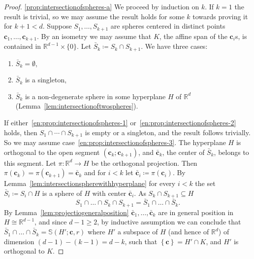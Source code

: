 \documentclass[12pt]{amsart}
\newcommand{\R}{\mathbb{R}}	%
\newcommand{\set}[1]{\mathopen \{ {#1} \mathclose \}} %
\newcommand{\setLR}[1]{\left \{ {#1} \right \}} %
\theoremstyle{plain}
\theoremstyle{definition}
\theoremstyle{remark}
\begin{document}
\begin{proof}
\ref{prop:intersectionofspheres-a} 
We proceed by induction on \( k \).
If \( k = 1 \) the result is trivial, so we may assume the result holds for some \( k \) towards proving it for \( k + 1 < d \).
Suppose \( S_1 , \dots , S_{ k + 1 } \) are spheres centered in distinct points \( \mathbf{c}_1 , \dots , \mathbf{c}_{ k + 1} \).
By an isometry we may assume that \( K \), the affine span of the \( \mathbf{c}_i \)s, is contained in \( \R^ { d - 1 } \times \set{0} \).
Let \( \bar{S}_k \coloneqq S_k \cap S_{k + 1} \).
We have three cases:
\begin{enumerate}[label={\upshape (\arabic*)}]
\item\label{en:prop:intersectionofspheres-1}
\( \bar{S}_k = \emptyset \),
\item\label{en:prop:intersectionofspheres-2}
\( \bar{S}_k \) is a singleton,
\item\label{en:prop:intersectionofspheres-3}
\( \bar{S}_k \) is a non-degenerate sphere in some hyperplane \( H \) of \( \R^d \) (Lemma~\ref{lem:intersectionoftwospheres}).
\end{enumerate} 
If either~\ref{en:prop:intersectionofspheres-1} or~\ref{en:prop:intersectionofspheres-2} holds, then \( S_1 \cap \cdots \cap S_{k + 1} \) is empty or a singleton, and the result follows trivially.
So we may assume case~\ref{en:prop:intersectionofspheres-3}.
The hyperplane \( H \) is orthogonal to the open segment \( ( \mathbf{c}_k ; \mathbf{c}_{ k + 1} ) \), and \( \bar{\mathbf{c}}_k \), the center of \( \bar{S}_k \), belongs to this segment.
Let \( \pi \colon \R^d \to H \) be the orthogonal projection.
Then \( \pi ( \mathbf{c}_k ) = \pi ( \mathbf{c}_{ k + 1 } ) = \bar{\mathbf{c}}_k \) and for \( i < k \) let \( \bar{\mathbf{c}}_i \coloneqq \pi ( \mathbf{c}_i ) \).
By Lemma~\ref{lem:intersectionspherewithhyperplane} for every \( i < k \) the set \( \bar{S}_i \coloneqq S_i \cap H \) is a sphere of \( H \) with center \( \bar{\mathbf{c}}_i \).
As \( S_k \cap S_{ k + 1} \subseteq H \) 
\[
S_1 \cap \dots \cap S_k \cap S_{ k + 1 } = \bar{S}_1 \cap \dots \cap \bar{S}_k .
\]
By Lemma~\ref{lem:projectiogeneralposition} \( \bar{\mathbf{c}}_1 , \dots , \bar{\mathbf{c}}_k \) are in general position in \( H \cong \R^{ d - 1} \), and since \( d - 1 \geq 2 \), by inductive assumption we can conclude that \( \bar{S}_1 \cap \dots \cap \bar{S}_k = \mathbb{S} ( H' ; \mathbf{c} , r ) \) where \( H' \) a subspace of \( H \) (and hence of \( \R^d \)) of dimension \( ( d - 1 ) - ( k - 1 ) = d - k \), such that \( \setLR{\mathbf{c} } = H' \cap K \), and \( H' \) is orthogonal to \( K \).


\end{proof}
\end{document}
